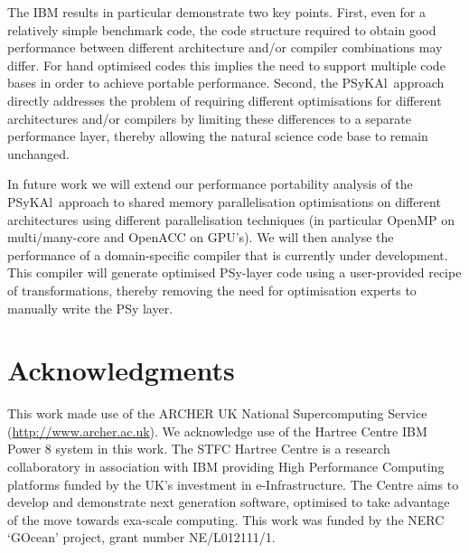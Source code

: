 \documentclass{IOS-Book-Article}
\newcommand{\psykal}{{PS}y{KA}l\ }
\begin{document}
The IBM results in particular demonstrate two key points.
%
First, even for a relatively simple
benchmark code, the code structure required to obtain good performance
between different architecture and/or compiler combinations may
differ. For hand optimised codes this implies the need to support
multiple code bases in order to achieve portable performance.
%
Second, the \psykal approach directly addresses the problem of
requiring different optimisations for different architectures and/or
compilers by limiting these differences to a separate performance
layer, thereby allowing the natural science code base to remain
unchanged.

In future work we will extend our performance portability analysis of
the \psykal approach to shared memory parallelisation optimisations on
different architectures using different parallelisation techniques (in
particular OpenMP on multi/many-core and OpenACC on GPU's).
%
We will then analyse the performance of a domain-specific compiler
that is currently under development. This compiler will generate
optimised PSy-layer code using a user-provided recipe of
transformations, thereby removing the need for optimisation experts to
manually write the PSy layer.

\section*{Acknowledgments}

This work made use of the ARCHER UK National Supercomputing Service
(\url{http://www.archer.ac.uk}). We acknowledge use of the Hartree
Centre IBM Power 8 system in this work. The STFC Hartree Centre is a
research collaboratory in association with IBM providing High
Performance Computing platforms funded by the UK's investment in
e-Infrastructure. The Centre aims to develop and demonstrate next
generation software, optimised to take advantage of the move towards
exa-scale computing. This work was funded by the NERC `GOcean' project,
grant number NE/L012111/1.



%
\end{document}
